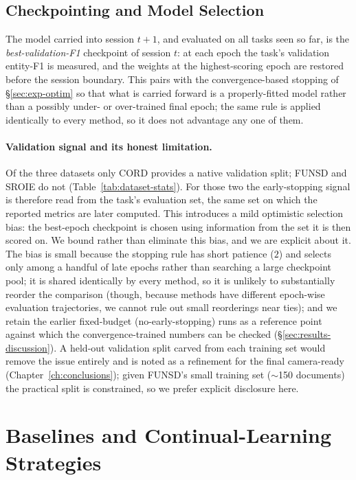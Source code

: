 \subsection{Checkpointing and Model Selection}
\label{sec:exp-checkpointing}

The model carried into session $t{+}1$, and evaluated on all tasks seen so
far, is the \emph{best-validation-F1} checkpoint of session $t$: at each epoch the
task's validation entity-F1 is measured, and the weights at the highest-scoring epoch
are restored before the session boundary. This pairs with the convergence-based
stopping of \S\ref{sec:exp-optim} so that what is carried forward is a properly-fitted
model rather than a possibly under- or over-trained final epoch; the same rule is
applied identically to every method, so it does not advantage any one of them.

\paragraph{Validation signal and its honest limitation.} Of the three datasets only
CORD provides a native validation split; FUNSD and SROIE do not
(Table~\ref{tab:dataset-stats}). For those two the early-stopping signal is therefore
read from the task's evaluation set, the same set on which the reported metrics are
later computed. This introduces a mild optimistic selection bias: the best-epoch
checkpoint is chosen using information from the set it is then scored on. We bound
rather than eliminate this bias, and we are explicit about it. The bias is small
because the stopping rule has short patience ($2$) and selects only among a handful of
late epochs rather than searching a large checkpoint pool; it is shared identically by
every method, so it is unlikely to substantially reorder the comparison (though, because
methods have different epoch-wise evaluation trajectories, we cannot rule out small
reorderings near ties); and we retain the earlier
fixed-budget (no-early-stopping) runs as a reference point against which the
convergence-trained numbers can be checked (\S\ref{sec:results-discussion}). A
held-out validation split carved from each training set would remove the issue
entirely and is noted as a refinement for the final camera-ready
(Chapter~\ref{ch:conclusions}); given FUNSD's small training set ($\sim$150 documents)
the practical split is constrained, so we prefer explicit disclosure here.

\section{Baselines and Continual-Learning Strategies}
\label{sec:exp-baselines}


